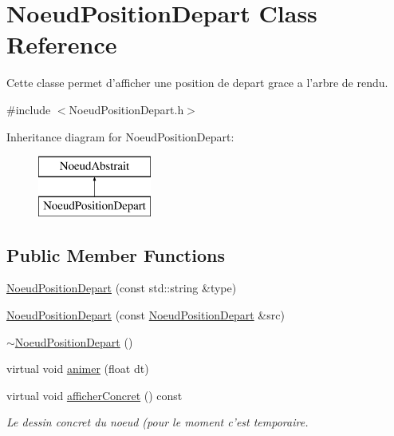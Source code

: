 \hypertarget{class_noeud_position_depart}{\section{Noeud\-Position\-Depart Class Reference}
\label{class_noeud_position_depart}
}


Cette classe permet d'afficher une position de depart grace a l'arbre de rendu.  




{\ttfamily \#include $<$Noeud\-Position\-Depart.\-h$>$}

Inheritance diagram for Noeud\-Position\-Depart\-:\begin{figure}[H]
\begin{center}
\leavevmode
\includegraphics[height=2.000000cm]{class_noeud_position_depart}
\end{center}
\end{figure}
\subsection*{Public Member Functions}
\begin{DoxyCompactItemize}
\item 
\hyperlink{class_noeud_position_depart_a236d93969d761048212958011d3d6973}{Noeud\-Position\-Depart} (const std\-::string \&type)
\item 
\hyperlink{class_noeud_position_depart_a2a1e3c7807399c8451a6ec4215456205}{Noeud\-Position\-Depart} (const \hyperlink{class_noeud_position_depart}{Noeud\-Position\-Depart} \&src)
\item 
\hyperlink{class_noeud_position_depart_a1b301b686153b5df3e9e5789a4dc760d}{$\sim$\-Noeud\-Position\-Depart} ()
\item 
virtual void \hyperlink{class_noeud_position_depart_aa87b39fbe5ae4f44519645a58c20cec4}{animer} (float dt)
\item 
virtual void \hyperlink{class_noeud_position_depart_a39b82bb20a515295048655572e58b9ab}{afficher\-Concret} () const 
\begin{DoxyCompactList}\small\item\em Le dessin concret du noeud (pour le moment c'est temporaire. \end{DoxyCompactList}\end{DoxyCompactItemize}
